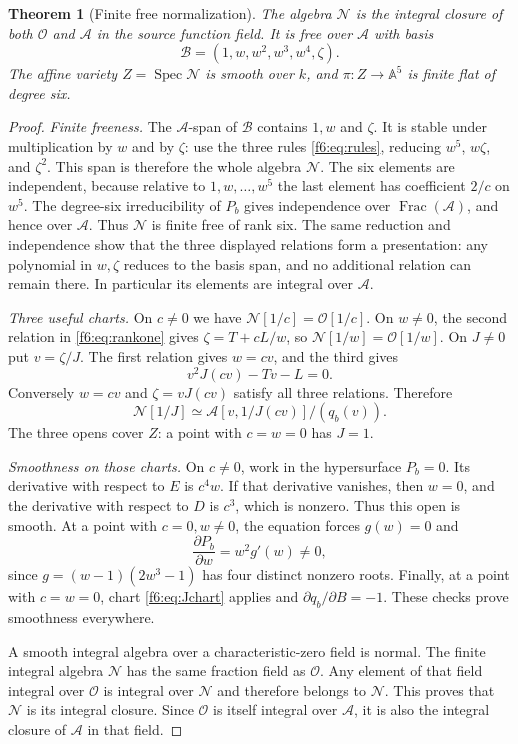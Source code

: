 \documentclass[11pt,a4paper]{article}
\newtheorem{theorem}{Theorem}[section]
\theoremstyle{definition}
\newcommand{\A}{\mathbb A}
\newcommand{\Spec}{\operatorname{Spec}}
\newcommand{\base}{\mathcal A}
\newcommand{\normal}{\mathcal N}
\newcommand{\ord}{\mathcal O}
\begin{document}
\begin{theorem}[Finite free normalization]\label{f6:thm:normalization}
The algebra $\normal$ is the integral closure of both $\ord$ and $\base$
in the source function field. It is free over $\base$ with basis
\[
 \mathcal B=(1,w,w^2,w^3,w^4,\zeta).
\]
The affine variety $Z=\Spec\normal$ is smooth over $k$, and
$\pi:Z\to\A^5$ is finite flat of degree six.
\end{theorem}
\begin{proof}
\emph{Finite freeness.} The $\base$-span of $\mathcal B$ contains $1,w$
and $\zeta$. It is stable under multiplication by $w$ and by $\zeta$:
use the three rules \eqref{f6:eq:rules}, reducing $w^5$, $w\zeta$, and
$\zeta^2$. This span is therefore the whole algebra $\normal$.
The six elements are independent, because relative to
$1,w,\ldots,w^5$ the last element has coefficient $2/c$ on $w^5$.
The degree-six irreducibility of $P_b$ gives independence over
$\operatorname{Frac}(\base)$, and hence over $\base$.
Thus $\normal$ is finite free of rank six. The same reduction and
independence show that the three displayed relations form a presentation:
any polynomial in $w,\zeta$ reduces to the basis span, and no additional
relation can remain there. In particular its elements are integral over
$\base$.

\emph{Three useful charts.} On $c\ne0$ we have
$\normal[1/c]=\ord[1/c]$. On $w\ne0$, the second relation in
\eqref{f6:eq:rankone} gives $\zeta=T+cL/w$, so
$\normal[1/w]=\ord[1/w]$. On $J\ne0$ put $v=\zeta/J$. The first
relation gives $w=cv$, and the third gives
\[
 v^2J(cv)-Tv-L=0.
\]
Conversely $w=cv$ and $\zeta=vJ(cv)$ satisfy all three relations. Therefore
\begin{equation}\label{f6:eq:Jchart}
 \normal[1/J]\simeq
 \base[v,1/J(cv)]/(q_b(v)).
\end{equation}
The three opens cover $Z$: a point with $c=w=0$ has $J=1$.

\emph{Smoothness on those charts.} On $c\ne0$, work in the hypersurface
$P_b=0$. Its derivative with respect to $E$ is $c^4w$. If that derivative
vanishes, then $w=0$, and the derivative with respect to $D$ is $c^3$,
which is nonzero. Thus this open is smooth. At a point with $c=0,w\ne0$,
the equation forces $g(w)=0$ and
\[
 \frac{\partial P_b}{\partial w}=w^2g'(w)\ne0,
\]
since $g=(w-1)(2w^3-1)$ has four distinct nonzero roots.
Finally, at a point with $c=w=0$, chart \eqref{f6:eq:Jchart} applies and
$\partial q_b/\partial B=-1$. These checks prove smoothness everywhere.

A smooth integral algebra over a characteristic-zero field is normal.
The finite integral algebra $\normal$ has the same fraction field as
$\ord$. Any element of that field integral over $\ord$ is integral over
$\normal$ and therefore belongs to $\normal$. This proves that
$\normal$ is its integral closure. Since $\ord$ is itself integral over
$\base$, it is also the integral closure of $\base$ in that field.
\end{proof}
\end{document}
